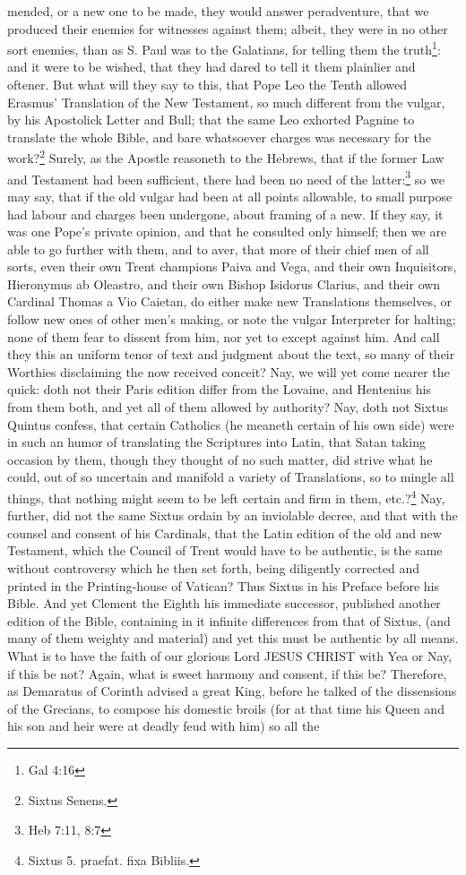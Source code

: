 mended, or a new one to be made, they would answer peradventure, that we produced their enemies for witnesses against them; albeit, they were in no other sort enemies, than as S. Paul was to the Galatians, for telling them the truth\footnote{Gal 4:16}: and it were to be wished, that they had dared to tell it them plainlier and oftener. But what will they say to this, that Pope Leo the Tenth allowed Erasmus' Translation of the New Testament, so much different from the vulgar, by his Apostolick Letter and Bull; that the same Leo exhorted Pagnine to translate the whole Bible, and bare whatsoever charges was necessary for the work?\footnote{Sixtus Senens.} Surely, as the Apostle reasoneth to the Hebrews, that if the former Law and Testament had been sufficient, there had been no need of the latter:\footnote{Heb 7:11, 8:7} so we may say, that if the old vulgar had been at all points allowable, to small purpose had labour and charges been undergone, about framing of a new. If they say, it was one Pope's private opinion, and that he consulted only himself; then we are able to go further with them, and to aver, that more of their chief men of all sorts, even their own Trent champions Paiva and Vega, and their own Inquisitors, Hieronymus ab Oleastro, and their own Bishop Isidorus Clarius, and their own Cardinal Thomas a Vio Caietan, do either make new Translations themselves, or follow new ones of other men's making, or note the vulgar Interpreter for halting; none of them fear to dissent from him, nor yet to except against him. And call they this an uniform tenor of text and judgment about the text, so many of their Worthies disclaiming the now received conceit? Nay, we will yet come nearer the quick: doth not their Paris edition differ from the Lovaine, and Hentenius his from them both, and yet all of them allowed by authority? Nay, doth not Sixtus Quintus confess, that certain Catholics (he meaneth certain of his own side) were in such an humor of translating the Scriptures into Latin, that Satan taking occasion by them, though they thought of no such matter, did strive what he could, out of so uncertain and manifold a variety of Translations, so to mingle all things, that nothing might seem to be left certain and firm in them, etc.?\footnote{Sixtus 5. praefat. fixa Bibliis.} Nay, further, did not the same Sixtus ordain by an inviolable decree, and that with the counsel and consent of his Cardinals, that the Latin edition of the old and new Testament, which the Council of Trent would have to be authentic, is the same without controversy which he then set forth, being diligently corrected and printed in the Printing-house of Vatican? Thus Sixtus in his Preface before his Bible. And yet Clement the Eighth his immediate successor, published another edition of the Bible, containing in it infinite differences from that of Sixtus, (and many of them weighty and material) and yet this must be authentic by all means. What is to have the faith of our glorious Lord JESUS CHRIST with Yea or Nay, if this be not? Again, what is sweet harmony and consent, if this be? Therefore, as Demaratus of Corinth advised a great King, before he talked of the dissensions of the Grecians, to compose his domestic broils (for at that time his Queen and his son and heir were at deadly feud with him) so all the 